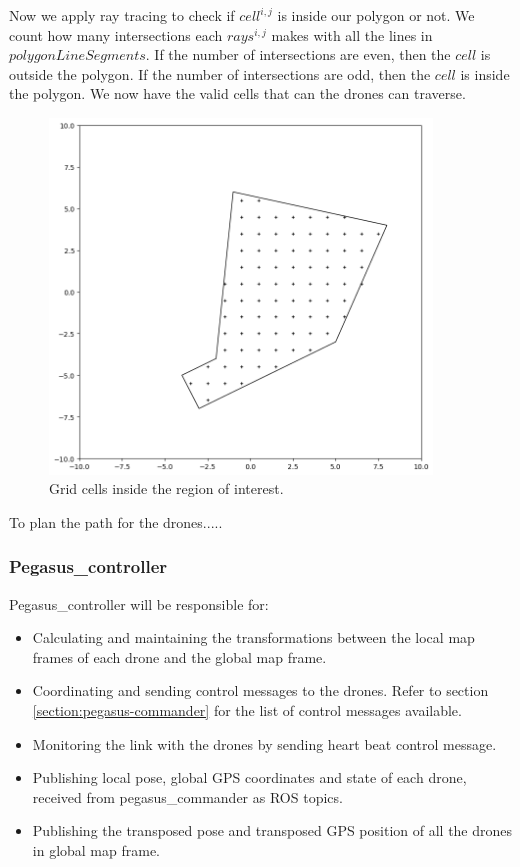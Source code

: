 Now we apply ray tracing to check if $cell^{i,j}$ is inside our polygon or not. We count how many intersections each $rays^{i,j}$ makes with all the lines in $polygonLineSegments$. If the number of intersections are even, then the $cell$ is outside the polygon. If the number of intersections are odd, then the $cell$ is inside the polygon. We now have the valid cells that can the drones can traverse.
\begin{figure} \label{fig:pegasus-planner-generate-valid-cells}
  \centering
  \includegraphics[width=4in]{figures/methodology/pegasus_planner/generate_grid/valid-cells}
  \caption[Grid inside the region of interest]{\small Grid cells inside the region of interest.}
\end{figure}

To plan the path for the drones.....

\subsubsection{Pegasus\_controller}

Pegasus\_controller will be responsible for:
\begin{itemize}
  \item Calculating and maintaining the transformations between the local map frames of each drone and the global map frame.
  \item Coordinating and sending control messages to the drones. Refer to section \ref{section:pegasus-commander} for the list of control messages available.
  \item Monitoring the link with the drones by sending heart beat control message.
  \item Publishing local pose, global GPS coordinates and state of each drone, received from pegasus\_commander as ROS topics.
  \item Publishing the transposed pose and transposed GPS position of all the drones in global map frame.
\end{itemize}

